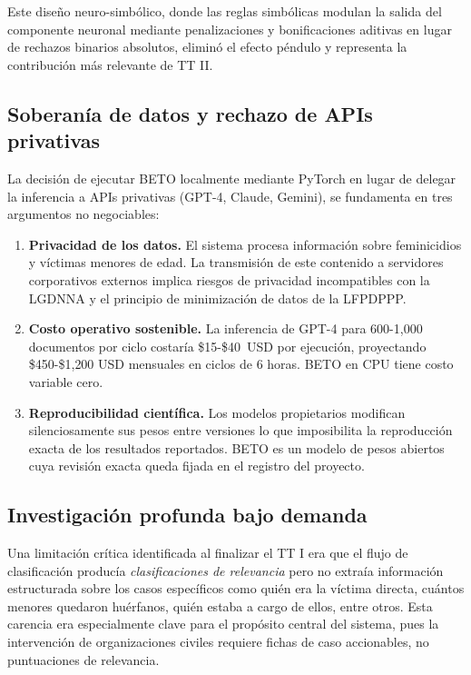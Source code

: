 Este diseño neuro-simbólico, donde las reglas simbólicas modulan la salida del componente neuronal
mediante penalizaciones y bonificaciones aditivas en lugar de rechazos binarios absolutos,
eliminó el efecto péndulo y representa la contribución más relevante de TT II.

\subsection{Soberanía de datos y rechazo de APIs privativas}
\label{subsec:ea_soberania_datos}

La decisión de ejecutar BETO localmente mediante PyTorch en lugar de delegar
la inferencia a APIs privativas (GPT-4, Claude, Gemini), se fundamenta en tres
argumentos no negociables:

\begin{enumerate}
    \item \textbf{Privacidad de los datos.} El sistema procesa información sobre
          feminicidios y víctimas menores de edad. La transmisión de este contenido
          a servidores corporativos externos implica riesgos de privacidad
          incompatibles con la LGDNNA y el principio de minimización de datos
          de la LFPDPPP.

    \item \textbf{Costo operativo sostenible.} La inferencia de GPT-4 para
          600-1{,}000 documentos por ciclo costaría \$15-\$40~USD por ejecución,
          proyectando \$450-\$1{,}200 USD mensuales en ciclos de 6 horas. BETO
          en CPU tiene costo variable cero.

    \item \textbf{Reproducibilidad científica.} Los modelos propietarios modifican
          silenciosamente sus pesos entre versiones lo que imposibilita la reproducción
          exacta de los resultados reportados. BETO es un modelo de pesos abiertos
          cuya revisión exacta queda fijada en el registro del proyecto.
\end{enumerate}

\subsection{Investigación profunda bajo demanda}
\label{subsec:ea_deepinvestigator}

Una limitación crítica identificada al finalizar el TT I era que el flujo de clasificación producía
\textit{clasificaciones de relevancia} pero no extraía información estructurada sobre
los casos específicos como quién era la víctima directa, cuántos menores quedaron huérfanos,
quién estaba a cargo de ellos, entre otros. Esta carencia era especialmente clave
para el propósito central del sistema, pues la intervención de organizaciones civiles requiere
fichas de caso accionables, no puntuaciones de relevancia.

